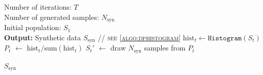 
\begin{algorithm}[t]
    
    \caption{\texttt{PrE-Text} \label{private evolution}}
    \begin{algorithmic}[1]
     Number of iterations: $T$\\
     \hspace{\algorithmicindent} Number of generated samples: $N_{\text{syn}}$\\
     \hspace{\algorithmicindent} Initial population: $S_1$ \label{line:initialpop} \\
     {\bfseries Output:} Synthetic data $S_{\text{syn}}$ 
        \State \textsc{// see \cref{algo:dphistogram}}
        \State $\text{hist}_t \gets \texttt{Histogram}(S_t)$ \label{line:dp_hist}
        \State $P_t$ $\gets$ $\text{hist}_t / \text{sum}(\text{hist}_t)$
        \State $S_t'$ $\gets$ draw $N_{\text{syn}}$ samples from $P_t$ \label{line:surviving}
        \State {}\label{line:variation}
    \EndFor

      \State  {}
    \State \Return $S_{\text{syn}}$
    \end{algorithmic}
\end{algorithm}

